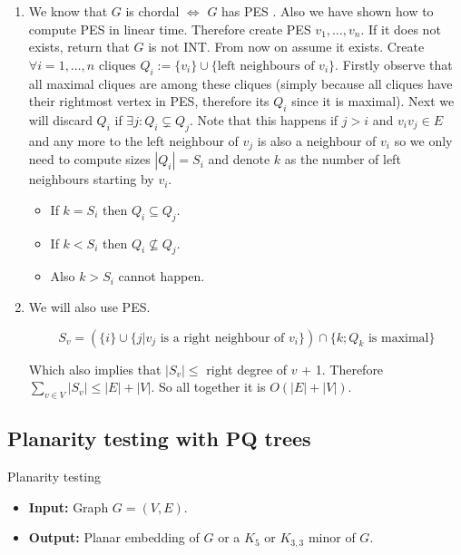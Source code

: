 \begin{enumerate}
	\item We know that $G$ is chordal $\iff$ $G$ has PES \PES. Also we have shown how to compute PES in linear time. Therefore create PES $v_{1}, \dots, v_{n}$. If it does not exists, return that $G$ is not INT. From now on assume it exists. Create $\forall i = 1, \dots, n$ cliques $Q_{i} := \{v_{i}\} \cup \{\text{left neighbours of } v_{i}\}$. Firstly observe that all maximal cliques are among these cliques (simply because all cliques have their rightmost vertex in PES, therefore its $Q_{i}$ since it is maximal). Next we will discard $Q_{i}$  if $\exists j : Q_{i} \subsetneq Q_{j}$. Note that this happens if $j > i$ and $v_{i}v_{j} \in E$ and any more to the left neighbour of $v_{j}$ is also a neighbour of $v_{i}$ so we only need to compute sizes $|Q_{i}| = S_{i}$ and denote $k$ as the number of left neighbours starting by $v_{i}$.
		\begin{itemize}
			\item If $k = S_{i}$ then $Q_{i} \subseteq Q_{j}$.
			\item If $k < S_{i}$ then $Q_{i} \nsubseteq Q_{j}$.
			\item Also $k > S_{i}$ cannot happen.
		\end{itemize}

	\item We will also use PES.

	$$
	S_{v} = (\{i\} \cup \{j | v_{j} \text{ is a right neighbour of } v_{i}\}) \cap \{k; Q_{k} \text{ is maximal}\}
	$$

	Which also implies that $|S_{v}| \leq$ right degree of $v$ + 1. Therefore $\sum_{v \in V} |S_{v}| \leq |E| + |V|$. So all together it is $O(|E| + |V|)$.
\end{enumerate}

\subsection{Planarity testing with PQ trees}

\begin{mybox}{Planarity testing}
	\begin{itemize}[]
		\item \textbf{Input:} Graph $G = (V,E)$.
		\item \textbf{Output:} Planar embedding of $G$ or a $K_{5}$ or $K_{3,3}$ minor of $G$.
	\end{itemize}
\end{mybox}

